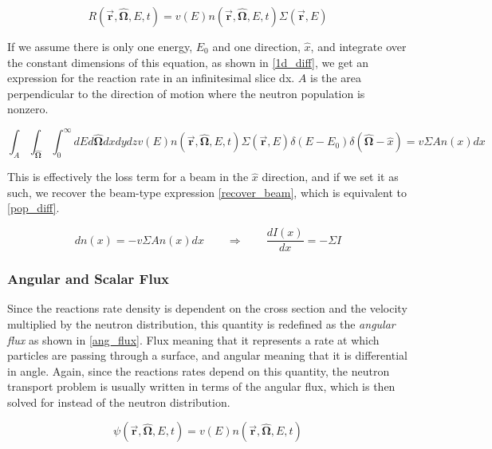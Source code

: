 \begin{equation}
\label{RR}
R(\boldsymbol{\vec{r}},\boldsymbol{\hat{\Omega}},E,t)  = v(E) n(\boldsymbol{\vec{r}},\boldsymbol{\hat{\Omega}},E,t) \Sigma(\boldsymbol{\vec{r}},E)
\end{equation}

If we assume there is only one energy, $E_0$ and one direction, $\hat{x}$, and integrate over the constant dimensions of this equation, as shown in \eqref{1d_diff}, we get an expression for the reaction rate in an infinitesimal slice dx.  $A$ is the area perpendicular to the direction of motion where the neutron population is nonzero.


\begin{equation}
\label{1d_diff}
\int_A \int_{\boldsymbol{\hat{\Omega}}} \int_0^{\infty}  dE d\boldsymbol{\hat{\Omega}} dxdydz  v(E) n(\boldsymbol{\vec{r}},\boldsymbol{\hat{\Omega}},E,t) \Sigma(\boldsymbol{\vec{r}},E) \delta(E-E_0) \delta(\boldsymbol{\hat{\Omega}}-\hat{x})  = v \Sigma A n(x)dx 
\end{equation}

This is effectively the loss term for a beam in the $\hat{x}$ direction, and if we set it as such, we recover the beam-type expression \eqref{recover_beam}, which is equivalent to \eqref{pop_diff}.  

\begin{equation}
\label{recover_beam}
dn(x) = - v \Sigma A n(x)dx  \qquad \Rightarrow \qquad  \frac{dI(x)}{dx}= - \Sigma I
\end{equation}


\subsubsection{Angular and Scalar Flux}

Since the reactions rate density is dependent on the cross section and the velocity multiplied by the neutron distribution, this quantity is redefined as the \emph{angular flux} as shown in \eqref{ang_flux}.  Flux meaning that it represents a rate at which particles are passing through a surface, and angular meaning that it is differential in angle.  Again, since the reactions rates depend on this quantity, the neutron transport problem is usually written in terms of the angular flux, which is then solved for instead of the neutron distribution.

\begin{equation}
\label{ang_flux}
\psi(\boldsymbol{\vec{r}},\boldsymbol{\hat{\Omega}},E,t) = v(E) n(\boldsymbol{\vec{r}},\boldsymbol{\hat{\Omega}},E,t)
\end{equation}

